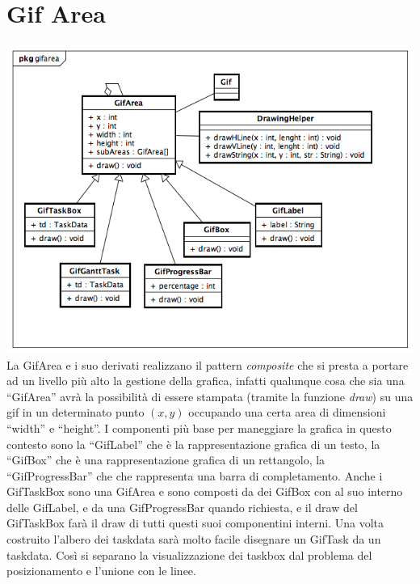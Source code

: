 \documentclass[a4paper, 12pt]{report}
\begin{document}
\section{Gif Area}
\includegraphics[width=\textwidth]{chart/GifArea.png}
La GifArea e i suo derivati realizzano il pattern \emph{composite} che si presta a portare ad un livello pi\`u alto la gestione della grafica, infatti qualunque cosa che sia una ``GifArea'' avr\`a la possibilità di essere stampata (tramite la funzione \emph{draw}) su una gif in un determinato punto $(x,y)$ occupando una certa area di dimensioni ``width'' e ``height''.
I componenti più base per maneggiare la grafica in questo contesto sono la ``GifLabel'' che \`e la rappresentazione grafica di un testo, la ``GifBox'' che \`e una rappresentazione grafica di un rettangolo, la ``GifProgressBar'' che che rappresenta una barra di completamento.
Anche i GifTaskBox sono una GifArea e sono composti da dei GifBox con al suo interno delle GifLabel, e da una GifProgressBar quando richiesta, e il draw del GifTaskBox far\`a il draw di tutti questi suoi componentini interni.
Una volta costruito l'albero dei taskdata sar\`a molto facile disegnare un GifTask da un taskdata.
Cos\`i si separano la visualizzazione dei taskbox dal problema del posizionamento e l'unione con le linee.
\end{document}
